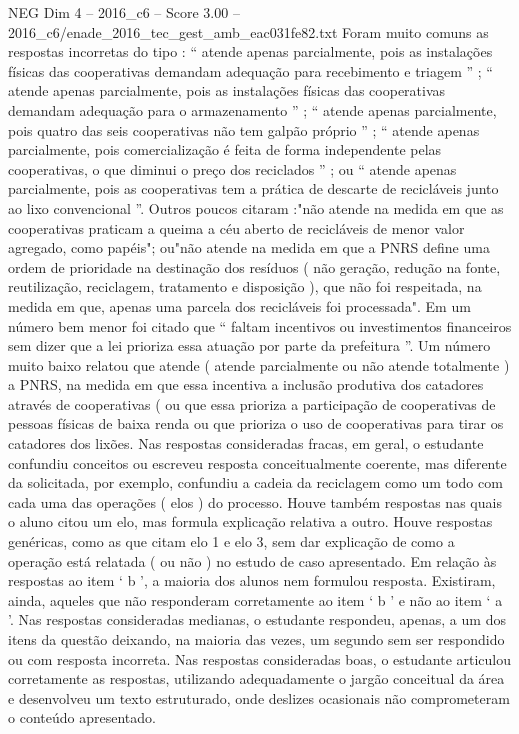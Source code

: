 \begin{textsample}{NEG Dim 4 – 2016\_c6 – Score 3.00 – 2016\_c6/enade\_2016\_tec\_gest\_amb\_eac031fe82.txt}
Foram muito comuns as respostas incorretas do tipo : “ atende apenas parcialmente, pois as instalações físicas das cooperativas demandam adequação para recebimento e triagem ” ; “ atende apenas parcialmente, pois as instalações físicas das cooperativas demandam adequação para o armazenamento ” ; “ atende apenas parcialmente, pois quatro das seis cooperativas não tem galpão próprio ” ; “ atende apenas parcialmente, pois comercialização é feita de forma independente pelas cooperativas, o que diminui o preço dos reciclados ” ; ou “ atende apenas parcialmente, pois as cooperativas tem a prática de descarte de recicláveis junto ao lixo convencional ”.
Outros poucos citaram :"não atende na medida em que as cooperativas praticam a queima a céu aberto de recicláveis de menor valor agregado, como papéis"; ou"não atende na medida em que a PNRS define uma ordem de prioridade na destinação dos resíduos ( não geração, redução na fonte, reutilização, reciclagem, tratamento e disposição ), que não foi respeitada, na medida em que, apenas uma parcela dos recicláveis foi processada".
Em um número bem menor foi citado que “ faltam incentivos ou investimentos financeiros sem dizer que a lei prioriza essa atuação por parte da prefeitura ”.
Um número muito baixo relatou que atende ( atende parcialmente ou não atende totalmente ) a PNRS, na medida em que essa incentiva a inclusão produtiva dos catadores através de cooperativas ( ou que essa prioriza a participação de cooperativas de pessoas físicas de baixa renda ou que prioriza o uso de cooperativas para tirar os catadores dos lixões.
Nas respostas consideradas fracas, em geral, o estudante confundiu conceitos ou escreveu resposta conceitualmente coerente, mas diferente da solicitada, por exemplo, confundiu a cadeia da reciclagem como um todo com cada uma das operações ( elos ) do processo.
Houve também respostas nas quais o aluno citou um elo, mas formula explicação relativa a outro.
Houve respostas genéricas, como as que citam elo 1 e elo 3, sem dar explicação de como a operação está relatada ( ou não ) no estudo de caso apresentado.
Em relação às respostas ao item ‘ b ’, a maioria dos alunos nem formulou resposta.
Existiram, ainda, aqueles que não responderam corretamente ao item ‘ b ’ e não ao item ‘ a ’.
Nas respostas consideradas medianas, o estudante respondeu, apenas, a um dos itens da questão deixando, na maioria das vezes, um segundo sem ser respondido ou com resposta incorreta.
Nas respostas consideradas boas, o estudante articulou corretamente as respostas, utilizando adequadamente o jargão conceitual da área e desenvolveu um texto estruturado, onde deslizes ocasionais não comprometeram o conteúdo apresentado.

\end{textsample}
